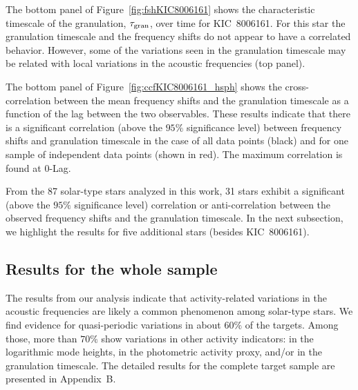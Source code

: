 \documentclass[twocolumn]{aastex61}%
\begin{document}
The bottom panel of Figure~\ref{fig:fshKIC8006161} shows the characteristic timescale of the granulation, $\tau_{\rm gran}$, over time for KIC~8006161. For this star the granulation timescale and the frequency shifts do not appear to have a correlated behavior. However, some of the variations seen in the granulation timescale may be related with local variations in the acoustic frequencies (top panel).

The bottom panel of Figure~\ref{fig:ccfKIC8006161_hsph} shows the cross-correlation between the mean frequency shifts and the granulation timescale as a function of the lag between the two observables. These results indicate that there is a significant correlation (above the $95\%$ significance level) between frequency shifts and granulation timescale in the case of all data points (black) and for one sample of independent data points (shown in red). The maximum correlation is found at 0-Lag.

From the 87 solar-type stars analyzed in this work, 31 stars exhibit a significant (above the $95\%$ significance level) correlation or anti-correlation between the observed frequency shifts and the granulation timescale. 
In the next subsection, we highlight the results for five additional stars (besides KIC~8006161).\vfill


\subsection{Results for the whole sample}\label{sec:extrastars} %

The results from our analysis indicate that activity-related variations in the acoustic frequencies are likely a common phenomenon among solar-type stars. We find evidence for quasi-periodic variations in about $60\%$ of the targets. Among those, more than $70\%$ show variations in other activity indicators: in the logarithmic mode heights, in the photometric activity proxy, and/or in the granulation timescale. The detailed results for the complete target sample are presented in Appendix~B.%
\end{document}
